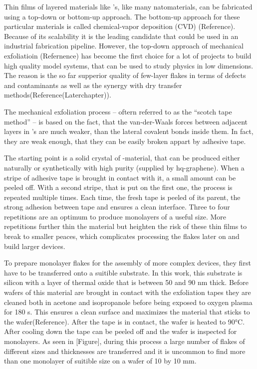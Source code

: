 Thin films of layered materials like \tmd's, like many natomaterials, can be fabricated using a top-down or bottom-up approach. The bottom-up approach for these particular materials is called chemical-vapor deposition (CVD) (Reference). Because of its scalability it is the leading candidate that could be used in an industrial fabrication pipeline. However, the top-down approach of mechanical exfoliatioin (Refernence) has become the first choice for a lot of projects to build high quality model systems, that can be used to study physics in low dimensions. The reason is the so far supperior quality of few-layer flakes in terms of defects and contaminants as well as the synergy with dry transfer methods(Reference(Laterchapter)). 

The mechanical exfoliation process -- oftern referred to as the ``scotch tape method'' -- is based on the fact, that the van-der-Waals forces between adjacent layers in \tmd's are much weaker, than the lateral covalent bonds inside them. In fact, they are weak enough, that they can be easily broken appart by adhesive tape.

The starting point is a solid crystal of \tmd-material, that can be produced either naturally or synthetically with high purity (supplied by hq-graphene). When a stripe of adhesive tape is brought in contact with it, a small amount can be peeled off. With a second stripe, that is put on the first one, the process is repeated multiple times. Each time, the fresh tape is peeled of its parent, the strong adhesion between tape and \tmdg ensures a clean interface. Three to four repetitions are an optimum to produce monolayers of a useful size. More repetitions further thin the material but heighten the risk of these thin films to break to smaller peaces, which complicates processing the flakes later on and build larger devices. 

To prepare monolayer flakes for the assembly of more complex devices, they first have to be transferred onto a suitible substrate. In this work, this substrate is silicon with a layer of thermal oxide that is between 50 and 90 nm thick. Before wafers of this material are brought in contact with the exfoliation tapes they are cleaned both in acetone and isopropanole before being exposed to oxygen plasma for 180 s. This ensures a clean surface and maximizes the material that sticks to the wafer(Reference). After the tape is in contact, the wafer is heated to 90°C. After cooling down the tape can be peeled off and the wafer is inspected for monolayers. As seen in [Figure], during this process a large number of flakes of different sizes and thicknesses are transferred and it is uncommon to find more than one monolayer of suitible size on a wafer of 10 by 10 mm. 

